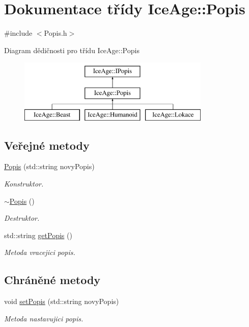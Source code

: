 \hypertarget{classIceAge_1_1Popis}{}\section{Dokumentace třídy Ice\+Age\+:\+:Popis}
\label{classIceAge_1_1Popis}


{\ttfamily \#include $<$Popis.\+h$>$}

Diagram dědičnosti pro třídu Ice\+Age\+:\+:Popis\begin{figure}[H]
\begin{center}
\leavevmode
\includegraphics[height=3.000000cm]{d8/d11/classIceAge_1_1Popis}
\end{center}
\end{figure}
\subsection*{Veřejné metody}
\begin{DoxyCompactItemize}
\item 
\hyperlink{classIceAge_1_1Popis_a19cf552765d577e462b5c40ccc5ab7e1}{Popis} (std\+::string novy\+Popis)
\begin{DoxyCompactList}\small\item\em Konstruktor. \end{DoxyCompactList}\item 
\hyperlink{classIceAge_1_1Popis_a3ba5866c6cbd58514918ea72790a5689}{$\sim$\+Popis} ()
\begin{DoxyCompactList}\small\item\em Destruktor. \end{DoxyCompactList}\item 
std\+::string \hyperlink{classIceAge_1_1Popis_a64fb2b82bb634ebe8194484711ec22c1}{get\+Popis} ()
\begin{DoxyCompactList}\small\item\em Metoda vracejici popis. \end{DoxyCompactList}\end{DoxyCompactItemize}
\subsection*{Chráněné metody}
\begin{DoxyCompactItemize}
\item 
void \hyperlink{classIceAge_1_1Popis_a9a1973711a1f7d5d533734f13813fcd9}{set\+Popis} (std\+::string novy\+Popis)
\begin{DoxyCompactList}\small\item\em Metoda nastavujici popis. \end{DoxyCompactList}\end{DoxyCompactItemize}
